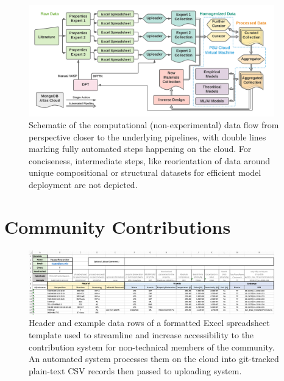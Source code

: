 \begin{figure}[H]
    \centering
    \includegraphics[width=0.95\textwidth]{ultera/ULTERA_Data_Cycle_v2.png}
    \caption{Schematic of the computational (non-experimental) data flow from perspective closer to the underlying pipelines, with double lines marking fully automated steps happening on the cloud. For conciseness, intermediate steps, like reorientation of data around unique compositional or structural datasets for efficient model deployment are not depicted.}
    \label{ultera:fig:datacycles}
\end{figure}




\section{Community Contributions} \label{ultera:sec:contributions}

\todo



\begin{figure}[H]
    \centering
    \includegraphics[width=0.95\textwidth]{ultera/ULTERA_Contribute.png}
    \caption{Header and example data rows of a formatted Excel spreadsheet template used to streamline and increase accessibility to the contribution system for non-technical members of the community. An automated system processes them on the cloud into git-tracked plain-text CSV records then passed to uploading system.}
    \label{ultera:fig:contributiontemplate}
\end{figure}




